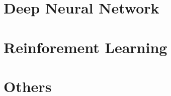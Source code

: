 \documentclass[reqno]{book}
\begin{document}
\chapter {Deep Neural Network}




\chapter{Reinforement Learning}



 









\chapter{Others}



{}



\printindex
\end{document}
